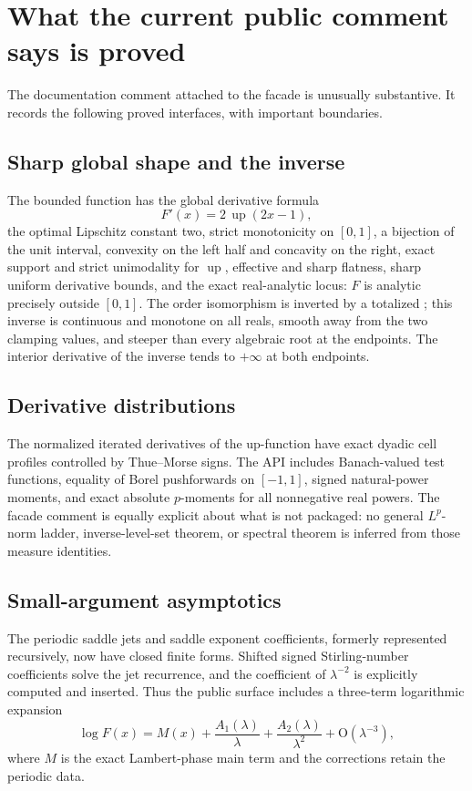 \documentclass[11pt,oneside]{report}
\theoremstyle{definition}
\theoremstyle{remark}
\DeclareRobustCommand{\lean}[1]{\texorpdfstring{\texttt{\expandafter\seqsplit\expandafter{\detokenize{#1}}}}{\detokenize{#1}}}
\newcommand{\upf}{\operatorname{up}}
\newcommand{\BigO}{\mathrm{O}}
\begin{document}
\section{What the current public comment says is proved}
The documentation comment attached to the facade is unusually substantive.  It
records the following proved interfaces, with important boundaries.

\subsection{Sharp global shape and the inverse}
The bounded function has the global derivative formula
\[
  F'(x)=2\,\upf(2x-1),
\]
the optimal Lipschitz constant two, strict monotonicity on \([0,1]\), a
bijection of the unit interval, convexity on the left half and concavity on the
right, exact support and strict unimodality for \(\upf\), effective and sharp
flatness, sharp uniform derivative bounds, and the exact real-analytic locus:
\(F\) is analytic precisely outside \([0,1]\).  The order isomorphism is
inverted by a totalized \lean{fabiusInv}; this inverse is continuous and
monotone on all reals, smooth away from the two clamping values, and steeper
than every algebraic root at the endpoints.  The interior derivative of the
inverse tends to \(+\infty\) at both endpoints.

\subsection{Derivative distributions}
The normalized iterated derivatives of the up-function have exact dyadic cell
profiles controlled by Thue--Morse signs.  The API includes Banach-valued test
functions, equality of Borel pushforwards on \([-1,1]\), signed natural-power
moments, and exact absolute \(p\)-moments for all nonnegative real powers.  The
facade comment is equally explicit about what is not packaged: no general
\(L^p\)-norm ladder, inverse-level-set theorem, or spectral theorem is inferred
from those measure identities.

\subsection{Small-argument asymptotics}
The periodic saddle jets and saddle exponent coefficients, formerly represented
recursively, now have closed finite forms.  Shifted signed Stirling-number
coefficients solve the jet recurrence, and the coefficient of
\(\lambda^{-2}\) is explicitly computed and inserted.  Thus the public surface
includes a three-term logarithmic expansion
\[
 \log F(x)=M(x)+\frac{A_1(\lambda)}{\lambda}
                  +\frac{A_2(\lambda)}{\lambda^2}
                  +\BigO(\lambda^{-3}),
\]
where \(M\) is the exact Lambert-phase main term and the corrections retain the
periodic data.
\end{document}
